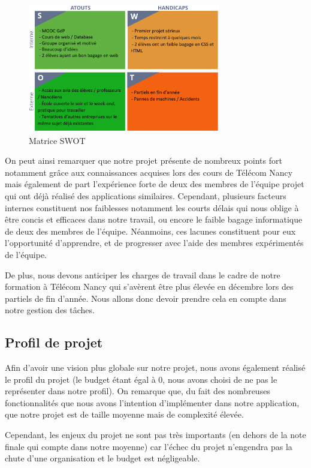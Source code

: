 \documentclass[french,a4paper]{article}
\begin{document}
\begin{figure}[H]
    \centering
    \includegraphics[width=0.75\textwidth]{img/SWOT.png}
    \caption{Matrice SWOT}
\end{figure} 

On peut ainsi remarquer que notre projet présente de nombreux points fort notamment grâce aux connaissances acquises lors des cours de Télécom Nancy mais également de part l’expérience forte de deux des membres de l’équipe projet qui ont déjà réalisé des applications similaires.  Cependant, plusieurs facteurs internes constituent nos faiblesses notamment les courts délais qui nous oblige à être concis et efficaces dans notre travail, ou encore le faible bagage informatique de deux des membres de l’équipe. Néanmoins, ces lacunes constituent pour eux l’opportunité d’apprendre, et de progresser avec l’aide des membres expérimentés de l’équipe.

De plus, nous devons anticiper les charges de travail dans le cadre de notre formation à Télécom Nancy qui s'avèrent être plus élevée en décembre lors des partiels de fin d'année. Nous allons donc devoir prendre cela en compte dans notre gestion des tâches. 

\subsection{Profil de projet}
Afin d’avoir une vision plus globale sur notre projet, nous avons également réalisé le profil du projet (le budget étant égal à 0, nous avons choisi de ne pas le représenter dans notre profil). On remarque que, du fait des nombreuses fonctionnalités que nous avons l’intention d’implémenter dans notre application, que notre projet est de taille moyenne mais de complexité élevée.

Cependant, les enjeux du projet ne sont pas très importants (en dehors de la note finale qui compte dans notre moyenne) car l'échec du projet n'engendra pas la chute d'une organisation et le budget est négligeable.
\end{document}
